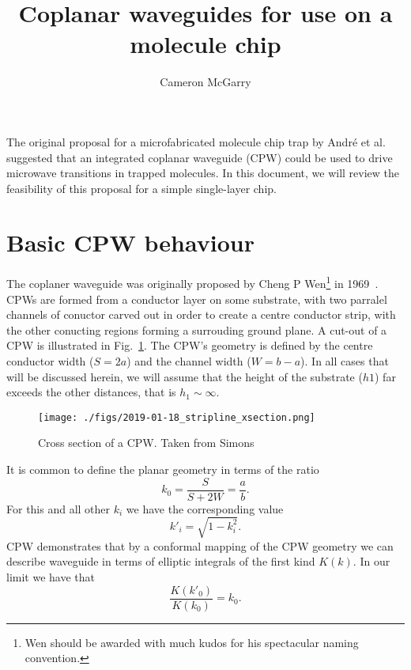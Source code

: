 \documentclass[a4paper]{article}
\title{Coplanar waveguides for use on a molecule chip}
\author{Cameron McGarry}
\begin{document}
\maketitle

The original proposal for a microfabricated molecule chip trap by Andr\'e et
al.~\cite{Andre2006} suggested that an integrated coplanar waveguide (CPW) could
be used to drive microwave transitions in trapped molecules. In this document,
we will review the feasibility of this proposal for a simple single-layer chip.

\section{Basic CPW behaviour}

The coplaner waveguide was originally proposed by Cheng P Wen\footnote{Wen
should be awarded with much kudos for his spectacular naming convention.} in
1969~\cite{1127105}. CPWs are formed from a conductor layer on some substrate,
with two parralel channels of conuctor carved out in order to create a centre
conductor strip, with the other conucting regions forming a surrouding ground
plane. A cut-out of a CPW is illustrated in Fig.~\ref{fig:CPWxsec}. The CPW's
geometry is defined by the centre conductor width ($S=2a$) and the channel width
($W=b-a$). In all cases that will be discussed herein, we will assume that the
height of the substrate ($h1$) far exceeds the other distances, that is $h_1
\sim \infty$.

\begin{figure}
  \texttt{[image: ./figs/2019-01-18\_stripline\_xsection.png]}
  \caption{Cross section of a CPW. Taken from Simons~\cite{Simons2004}}
  \label{fig:CPWxsec}
\end{figure}

It is common to define the planar geometry in terms of the ratio
\begin{equation}
  k_0 = \frac{S}{S+2W} = \frac{a}{b}.
  \label{eqn:k0def}
\end{equation}
For this and all other $k_i$ we have the corresponding value
\begin{equation}
  k'_i = \sqrt{1-k^2_i}.
\end{equation}
CPW demonstrates\cite{1127105} that by a conformal mapping of the CPW geometry
we can describe waveguide in terms of elliptic integrals of the first kind
$K(k)$. In our limit we have that
\begin{equation}
  \frac{K(k'_0)}{K(k_0)} = k_0.
  \label{eqn:k0rat}
\end{equation}
\end{document}
